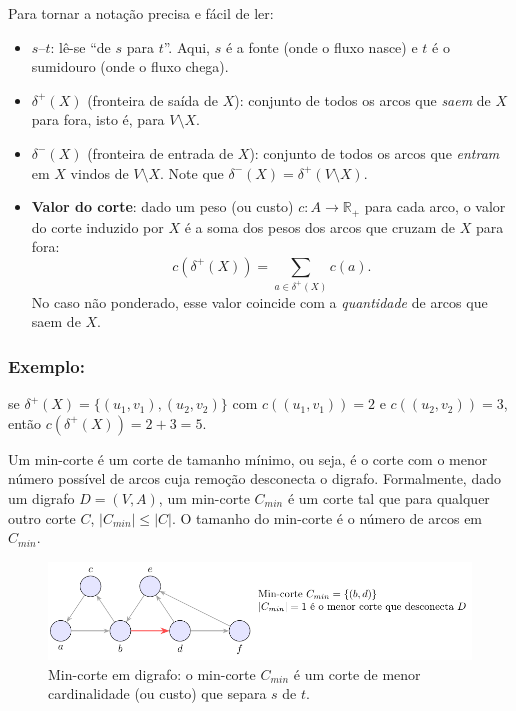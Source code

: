 Para tornar a notação precisa e fácil de ler:
\begin{itemize}
	\item \textbf{\(s\text{--}t\)}: lê-se “de \(s\) para \(t\)”. Aqui, \(s\) é a fonte (onde o fluxo nasce) e \(t\) é o sumidouro (onde o fluxo chega).
	\item \textbf{\(\delta^+(X)\)} (fronteira de saída de \(X\)): conjunto de todos os arcos que \emph{saem} de \(X\) para fora, isto é, para \(V\setminus X\).
	\item \textbf{\(\delta^-(X)\)} (fronteira de entrada de \(X\)): conjunto de todos os arcos que \emph{entram} em \(X\) vindos de \(V\setminus X\). Note que \(\delta^-(X)=\delta^+(V\setminus X)\).
	\item \textbf{Valor do corte}: dado um peso (ou custo) \(c:A\to\mathbb{R}_+\) para cada arco, o valor do corte induzido por \(X\) é a soma dos pesos dos arcos que cruzam de \(X\) para fora:
	      \[c(\delta^+(X))=\sum_{a\in\delta^+(X)} c(a).\]
	      No caso não ponderado, esse valor coincide com a \emph{quantidade} de arcos que saem de \(X\).
\end{itemize}

\subsubsection{Exemplo:} se \(\delta^+(X)=\{(u_1,v_1),(u_2,v_2)\}\) com \(c((u_1,v_1))=2\) e \(c((u_2,v_2))=3\), então \(c(\delta^+(X))=2+3=5\).


Um min-corte é um corte de tamanho mínimo, ou seja, é o corte com o menor número possível de arcos cuja remoção desconecta o digrafo. Formalmente, dado um digrafo \(D = (V, A)\), um min-corte \(C_{min}\) é um corte tal que para qualquer outro corte \(C\), \(|C_{min}| \leq |C|\). O tamanho do min-corte é o número de arcos em \(C_{min}\).


\begin{figure}[H]
	\centering
	\includegraphics[width=0.9\linewidth]{figures/fig_min_corte.pdf}

	\caption{Min-corte em digrafo: o min-corte $C_{min}$ é um corte de menor cardinalidade (ou custo) que separa $s$ de $t$.}
	\label{fig:min-corte}
\end{figure}


